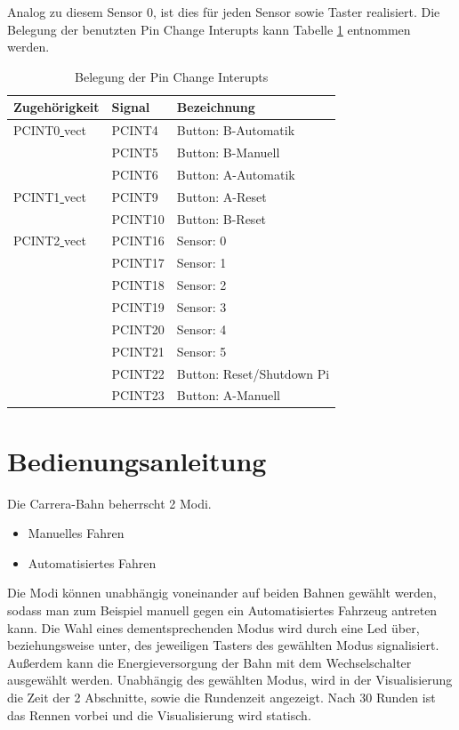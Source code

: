 \documentclass[a4paper, 11pt]{scrartcl}
\begin{document}
			Analog zu diesem Sensor 0, ist dies für jeden Sensor sowie Taster realisiert. Die Belegung der benutzten Pin Change Interupts kann Tabelle \ref{tab:belegungpcint} entnommen werden.
			\begin{table}[h]
				\begin{tabular}{|l|l|l|}
					\hline
					Zugehörigkeit & Signal & Bezeichnung\\
					\hline
					\hline
					PCINT0\underline{ }vect & PCINT4 & Button: B-Automatik\\
					\hline
											& PCINT5 & Button: B-Manuell\\
					\hline
											& PCINT6 & Button: A-Automatik\\
					\hline
					\hline
					PCINT1\underline{ }vect & PCINT9 & Button: A-Reset\\
					\hline
											& PCINT10 & Button: B-Reset\\
					\hline
					\hline
					PCINT2\underline{ }vect & PCINT16 & Sensor: 0\\
					\hline
											& PCINT17 & Sensor: 1\\
					\hline
											& PCINT18 & Sensor: 2\\
					\hline
											& PCINT19 & Sensor: 3\\
					\hline
											& PCINT20 & Sensor: 4\\
					\hline
											& PCINT21 & Sensor: 5\\
					\hline
											& PCINT22 & Button: Reset/Shutdown Pi\\
					\hline
											& PCINT23 & Button: A-Manuell\\
					\hline
				\end{tabular}
				\caption{Belegung der Pin Change Interupts}
				\label{tab:belegungpcint}
			\end{table}

	\newpage

\section{Bedienungsanleitung}
		Die Carrera-Bahn beherrscht 2 Modi.
		\begin{itemize}
			\item Manuelles Fahren
			\item Automatisiertes Fahren
		\end{itemize}
		Die Modi können unabhängig voneinander auf beiden Bahnen gewählt werden, sodass man zum Beispiel manuell
		gegen ein Automatisiertes Fahrzeug antreten kann.
		Die Wahl eines dementsprechenden Modus wird durch eine Led über, beziehungsweise unter, des jeweiligen
		Tasters des gewählten Modus signalisiert.
		Außerdem kann die Energieversorgung der Bahn mit dem Wechselschalter ausgewählt werden.
		Unabhängig des gewählten Modus, wird in der Visualisierung die Zeit der 2 Abschnitte, sowie die
		Rundenzeit angezeigt. Nach 30 Runden ist das Rennen vorbei und die Visualisierung wird statisch.
\end{document}
